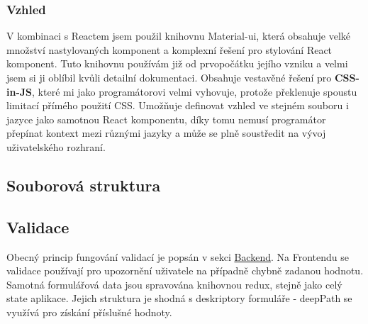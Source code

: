 \subsubsection{Vzhled}
V kombinaci s Reactem jsem použil knihovnu Material-ui, která obsahuje velké množství nastylovaných komponent a komplexní řešení pro stylování React komponent. Tuto knihovnu používám již od prvopočátku jejího vzniku a velmi jsem si ji oblíbil kvůli detailní dokumentaci. Obsahuje vestavěné řešení pro \textbf{CSS-in-JS}, které mi jako programátorovi velmi vyhovuje, protože překlenuje spoustu limitací přímého použití CSS. Umožňuje definovat vzhled ve stejném souboru i jazyce jako samotnou React komponentu, díky tomu nemusí programátor přepínat kontext mezi různými jazyky a může se plně soustředit na vývoj uživatelského rozhraní.

\subsection{Souborová struktura}

\subsection{Validace}
Obecný princip fungování validací je popsán v sekci \hyperref[BE:Validace]{Backend}. Na Frontendu se validace používají pro upozornění uživatele na případně chybně zadanou hodnotu. Samotná formulářová data jsou spravována knihovnou redux, stejně jako celý state aplikace. Jejich struktura je shodná s deskriptory formuláře - deepPath se využívá pro získání příslušné hodnoty.

